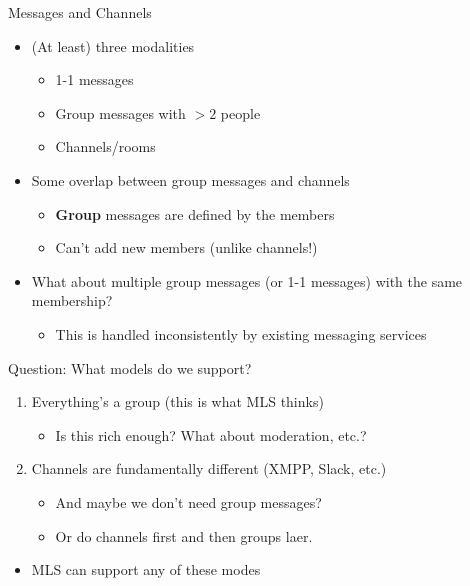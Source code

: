 \documentclass[helvetica]{beamer}
\begin{document}
\begin{frame}{Messages and Channels}
  \begin{itemize}
  \item (At least) three modalities
    \begin{itemize}
    \item 1-1 messages
    \item Group messages with $>2$ people
    \item Channels/rooms
    \end{itemize}
    
  \item Some overlap between group messages and channels
    \begin{itemize}
    \item \textbf{Group} messages are defined by the members
    \item Can't add new members (unlike channels!)      
    \end{itemize}
  \item What about multiple group messages (or 1-1 messages) with the same membership?
    \begin{itemize}
    \item This is handled inconsistently by existing messaging services
    \end{itemize}
  \end{itemize}
\end{frame}

\begin{frame}{Question: What models do we support?}

  \begin{enumerate}
  \item Everything's a group (this is what MLS thinks)
    \begin{itemize}
    \item Is this rich enough? What about moderation, etc.?      
    \end{itemize}
  \item Channels are fundamentally different (XMPP, Slack, etc.)
    \begin{itemize}
    \item And maybe we don't need group messages?
    \item Or do channels first and then groups laer.      
    \end{itemize}
  \end{enumerate}
  \begin{itemize}
  \item MLS can support any of these modes
  \end{itemize}
\end{frame}
\end{document}
